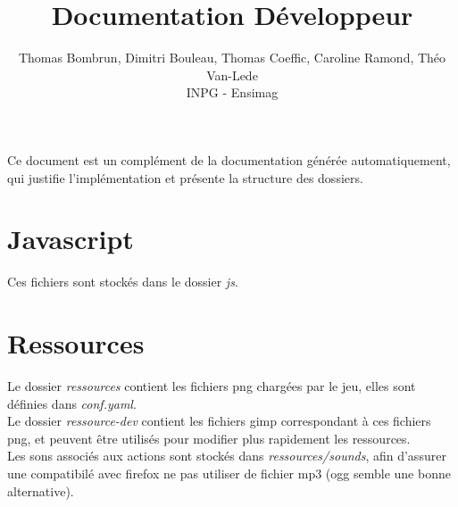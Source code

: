 \documentclass[11pt]{article}
\begin{document}
\title{Documentation Développeur}
\author{Thomas Bombrun, Dimitri Bouleau, Thomas Coeffic, Caroline Ramond, Théo Van-Lede\\
INPG - Ensimag}
\renewcommand{\today}{17 Juin 2014}
\maketitle
Ce document est un complément de la documentation générée automatiquement, 
qui justifie l'implémentation et présente la structure des dossiers.

\section {Javascript}
Ces fichiers sont stockés dans le dossier {\em js}.

\section {Ressources}
Le dossier {\em ressources} contient les fichiers png chargées par le jeu,
elles sont définies dans {\em conf.yaml}.\\
Le dossier {\em ressource-dev} contient les fichiers gimp correspondant à
ces fichiers png, et peuvent être utilisés pour modifier plus rapidement 
les ressources.\\
Les sons associés aux actions sont stockés dans {\em ressources/sounds}, afin 
d'assurer une compatibilé avec firefox ne pas utiliser de fichier mp3 (ogg
semble une bonne alternative).\\
\end{document}

